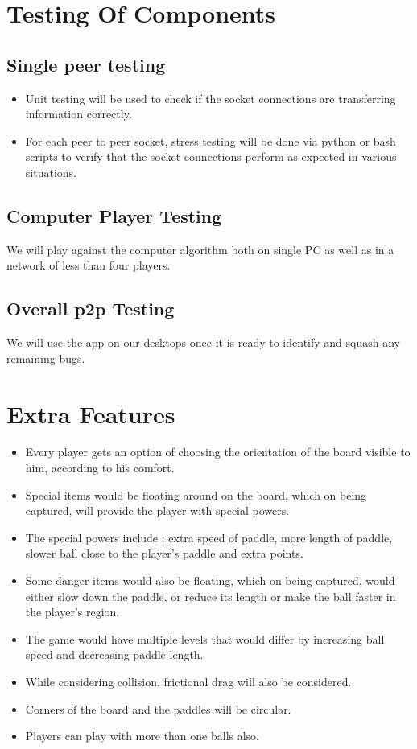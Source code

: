 \documentclass{article}
\begin{document}
	\section{Testing Of Components}
			\subsection{Single peer testing}
				\begin{itemize}
					\item Unit testing will be used to check if the socket connections are transferring information correctly.
					\item For each peer to peer socket, stress testing will be done via python or bash scripts to verify that the socket connections perform as expected in various situations.
				\end{itemize}

			\subsection{Computer Player Testing}
			We will play against the computer algorithm both on single PC as well as in a network of less than four players.
			\subsection{Overall p2p Testing}
				We will use the app on our desktops once it is ready to identify and squash any remaining bugs.
	\section{Extra Features}
	\begin{itemize}
	\item Every player gets an option of choosing the orientation of the board visible to him, according to his comfort.
	\item Special items would be floating around on the board, which on being captured, will provide the player with special powers.
	\item The special powers include : extra speed of paddle, more length of paddle, slower ball close to the player's paddle and extra points.
	\item Some danger items would also be floating, which on being captured, would either slow down the paddle, or reduce its length or make the ball faster in the player's region.
	\item The game would have multiple levels that would differ by increasing ball speed and decreasing paddle length.
	\item While considering collision, frictional drag will also be considered.
	\item Corners of the board and the paddles will be circular.
	\item Players can play with more than one balls also.
	\end{itemize}
\end{document}
